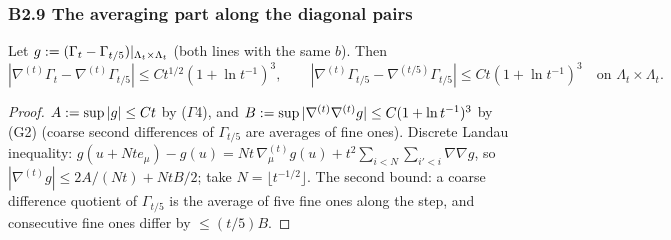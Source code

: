 
\subsubsection*{B2.9 The averaging part along the diagonal pairs}

\begin{lemma}\label{app:a04:lem:Lam}
Let $g:=(\Gamma_t-\Gamma_{t/5})|_{\Lambda_t\times\Lambda_t}$ (both lines with the same $b$). Then
\[
|\nabla^{(t)}\Gamma_t-\nabla^{(t)}\Gamma_{t/5}|\le Ct^{1/2}(1+\ln t^{-1})^3,\qquad|\nabla^{(t)}\Gamma_{t/5}-\nabla^{(t/5)}\Gamma_{t/5}|\le Ct(1+\ln t^{-1})^3\quad\text{on }\Lambda_t\times\Lambda_t.
\]
\end{lemma}
\begin{proof}
$A:=\sup|g|\le Ct$ by ($\Gamma$4), and $B:=\sup|\nabla^{(t)}\nabla^{(t)}g|\le C(1+\ln t^{-1})^3$ by (G2) (coarse second differences of $\Gamma_{t/5}$ are averages of fine ones). Discrete Landau inequality: $g(u+Nte_\mu)-g(u)=Nt\,\nabla^{(t)}_\mu g(u)+t^2\sum_{i<N}\sum_{i'<i}\nabla\nabla g$, so $|\nabla^{(t)}g|\le2A/(Nt)+NtB/2$; take $N=\lfloor t^{-1/2}\rfloor$. The second bound: a coarse difference quotient of $\Gamma_{t/5}$ is the average of five fine ones along the step, and consecutive fine ones differ by $\le(t/5)B$.
\end{proof}


